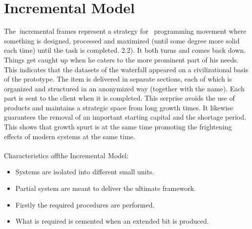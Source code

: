\documentclass[oneside,12pt]{Classes/VTU}
\begin{document}
    	\section{Incremental Model}
    	
    	The\tiny\textcolor{white}{n}\normalsize incremental frames represent a strategy for\tiny\textcolor{white}{m}\normalsize programming movement where something is designed, processed and maximized (until some degree more solid each time) until the task is completed. 2.2). It both turns and comes back down. Things get caught up when he caters to the more prominent part of his needs. This indicates that the datasets of the waterfall appeared on a civilizational basis of the prototype. The item is delivered in separate sections, each of which is organized and structured in an anonymized way (together with the name). Each part is sent to the client when it is completed. This serprise avoids the use of products and maintains a strategic space from long growth times. It likewise guarantees the removal of an important starting capital and the shortage period. This shows that growth spurt is at the same time promoting the frightening effects of modern systems at the same time.
    	\paragraph{}
    	Characteristics of\tiny\textcolor{white}{f}\normalsize the Incremental\tiny\textcolor{white}{s}\normalsize Model:
    	\begin{itemize}
    		\item Systems are isolated into different small units.
    		\item Partial system are meant to deliver the ultimate framework.
    		\item Firstly the required procedures are performed.
    		\item What is required is cemented when an extended bit is produced.
    	\end{itemize}
    	
\end{document}
